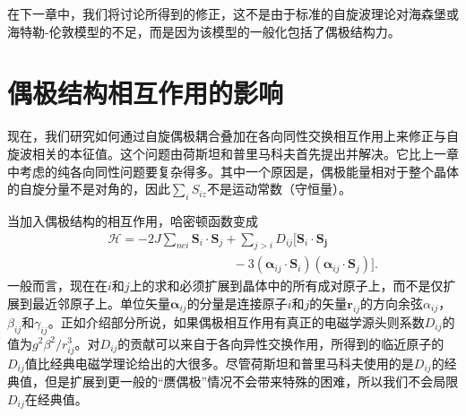 \documentclass{article}
\begin{document}
在下一章中，我们将讨论所得到的修正，这不是由于标准的自旋波理论对海森堡或海特勒-伦敦模型的不足，而是因为该模型的一般化包括了偶极结构力。




\section{偶极结构相互作用的影响} \label{sec:5}

现在，我们研究如何通过自旋偶极耦合叠加在各向同性交换相互作用上来修正与自旋波相关的本征值。这个问题由荷斯坦和普里马科夫首先提出并解决。它比上一章中考虑的纯各向同性问题要复杂得多。其中一个原因是，偶极能量相对于整个晶体的自旋分量不是对角的，因此$\sum_i S_{iz}$不是运动常数（守恒量）。

当加入偶极结构的相互作用，哈密顿函数变成
\begin{eqnarray} \label{eq:33}
&&\mathcal{H}=-2J\sum\nolimits_{\mathit{nei}}\mathbf{S}_i\cdot\mathbf{S}_j+\sum\nolimits_{j>i}D_{ij}[\mathbf{S}_i\cdot\mathbf{S_j}\nonumber\\
&&\phantom{~~~~~~~~~~~~~~~~~~~~~~~~~~~~~~~~~~~~~~~~~~~~~}-3(\boldsymbol{\alpha}_{ij}\cdot\mathbf{S}_i)(\boldsymbol{\alpha}_{ij}\cdot\mathbf{S}_j)].
\end{eqnarray}
一般而言，现在在$i$和$j$上的求和必须扩展到晶体中的所有成对原子上，而不是仅扩展到最近邻原子上。单位矢量$\boldsymbol{\alpha}_{ij}$的分量是连接原子$i$和$j$的矢量$\mathbf{r}_{ij}$的方向余弦$\alpha_{ij}$，$\beta_{ij}$和$\gamma_{ij}$。正如介绍部分所说，如果偶极相互作用有真正的电磁学源头则系数$D_{ij}$的值为$g^2\beta^2/r_{ij}^3$。对$D_{ij}$的贡献可以来自于各向异性交换作用，所得到的临近原子的$D_{ij}$值比经典电磁学理论给出的大很多。尽管荷斯坦和普里马科夫使用的是$D_{ij}$的经典值，但是扩展到更一般的“赝偶极”情况不会带来特殊的困难，所以我们不会局限$D_{ij}$在经典值。
\end{document}
